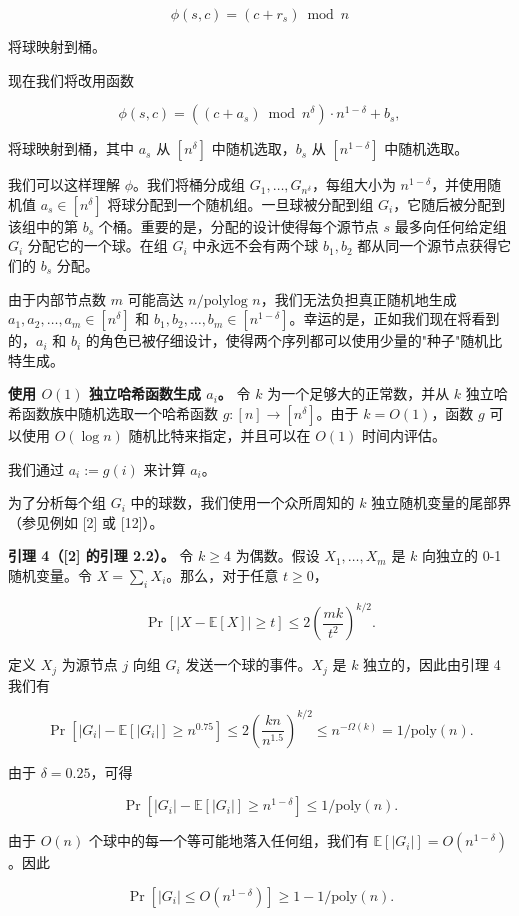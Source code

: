 \documentclass[12pt,a4paper]{ctexart}
\theoremstyle{remark}
\begin{document}
$$\phi(s,c)=(c+r_s)\bmod n$$

将球映射到桶。

现在我们将改用函数

$$\phi(s,c)=((c+a_s)\bmod n^{\delta})\cdot n^{1-\delta}+b_s,$$

将球映射到桶，其中 $a_s$ 从 $[n^{\delta}]$ 中随机选取，$b_s$ 从 $[n^{1-\delta}]$ 中随机选取。

我们可以这样理解 $\phi$。我们将桶分成组 $G_1,\ldots,G_{n^{\delta}}$，每组大小为 $n^{1-\delta}$，并使用随机值 $a_s\in[n^{\delta}]$ 将球分配到一个随机组。一旦球被分配到组 $G_i$，它随后被分配到该组中的第 $b_s$ 个桶。重要的是，分配的设计使得每个源节点 $s$ 最多向任何给定组 $G_i$ 分配它的一个球。在组 $G_i$ 中永远不会有两个球 $b_1,b_2$ 都从同一个源节点获得它们的 $b_s$ 分配。

由于内部节点数 $m$ 可能高达 $n/\text{polylog } n$，我们无法负担真正随机地生成 $a_1,a_2,\ldots,a_m\in[n^{\delta}]$ 和 $b_1,b_2,\ldots,b_m\in[n^{1-\delta}]$。幸运的是，正如我们现在将看到的，$a_i$ 和 $b_i$ 的角色已被仔细设计，使得两个序列都可以使用少量的"种子"随机比特生成。

\textbf{使用 $O(1)$ 独立哈希函数生成 $a_i$。} 令 $k$ 为一个足够大的正常数，并从 $k$ 独立哈希函数族中随机选取一个哈希函数 $g:[n]\to[n^{\delta}]$。由于 $k=O(1)$，函数 $g$ 可以使用 $O(\log n)$ 随机比特来指定，并且可以在 $O(1)$ 时间内评估。

我们通过 $a_i:=g(i)$ 来计算 $a_i$。

为了分析每个组 $G_i$ 中的球数，我们使用一个众所周知的 $k$ 独立随机变量的尾部界（参见例如 [2] 或 [12]）。

\textbf{引理 4（[2] 的引理 2.2）。} 令 $k\geq 4$ 为偶数。假设 $X_1,\ldots,X_m$ 是 $k$ 向独立的 0-1 随机变量。令 $X=\sum_i X_i$。那么，对于任意 $t\geq 0$，

$$\Pr[|X-\mathbb{E}[X]|\geq t]\leq 2\left(\frac{mk}{t^2}\right)^{k/2}.$$

定义 $X_j$ 为源节点 $j$ 向组 $G_i$ 发送一个球的事件。$X_j$ 是 $k$ 独立的，因此由引理 4 我们有

$$\Pr[|G_i|-\mathbb{E}[|G_i|]\geq n^{0.75}]\leq 2\left(\frac{kn}{n^{1.5}}\right)^{k/2}\leq n^{-\Omega(k)}=1/\text{poly}(n).$$

由于 $\delta=0.25$，可得

$$\Pr[|G_i|-\mathbb{E}[|G_i|]\geq n^{1-\delta}]\leq 1/\text{poly}(n).$$

由于 $O(n)$ 个球中的每一个等可能地落入任何组，我们有 $\mathbb{E}[|G_i|]=O(n^{1-\delta})$。因此

$$\Pr[|G_i|\leq O(n^{1-\delta})]\geq 1-1/\text{poly}(n).$$
\end{document}
